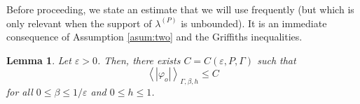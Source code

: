 \documentclass{article}
\newtheorem{lemma}[theorem]{Lemma}
\numberwithin{equation}{section}
\theoremstyle{definition}
\theoremstyle{definition}
\theoremstyle{remark}
\newtheorem{remark}{Remark}
\renewcommand{\d}{\mathrm{d}}
\newcommand\vp{\varphi}
\renewcommand{\d}{\mathrm{d}}
\newcommand{\Z}{\mathbb{Z}}
\renewcommand{\l}{\lambda}
\newcommand{\eps}{\varepsilon}
\newcommand{\G}{\Gamma}
\begin{document}
Before proceeding, we state an estimate that we will use frequently (but which is only relevant when the support of $\l^{(P)}$ is unbounded). 
It is an immediate consequence of Assumption \ref{asum:two} and the Griffiths inequalities.  
\begin{lemma}\label{lemma:massive}
	Let $\eps > 0$. Then, there exists $C = C(\eps,P,\G)$ such that 
	\begin{equation}\label{eq:massive}
	\left< |\vp_o| \right>_{\G,\beta,h} \leq C
	\end{equation} 
	for all $0 \leq \beta \leq 1 / \eps$ and $0 \leq h \leq 1$.
\end{lemma}

\end{document}
